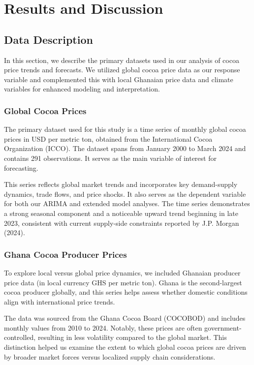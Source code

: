 \chapter{Results and Discussion}
\label{ch:Data}
\section{Data Description}

In this section, we describe the primary datasets used in our analysis of cocoa price trends and forecasts. We utilized global cocoa price data as our response variable and complemented this with local Ghanaian price data and climate variables for enhanced modeling and interpretation.

\subsection{Global Cocoa Prices}

The primary dataset used for this study is a time series of monthly global cocoa prices in USD per metric ton, obtained from the International Cocoa Organization (ICCO). The dataset spans from January 2000 to March 2024 and contains 291 observations. It serves as the main variable of interest for forecasting.

This series reflects global market trends and incorporates key demand-supply dynamics, trade flows, and price shocks. It also serves as the dependent variable for both our ARIMA and extended model analyses. The time series demonstrates a strong seasonal component and a noticeable upward trend beginning in late 2023, consistent with current supply-side constraints reported by J.P. Morgan (2024).

\subsection{Ghana Cocoa Producer Prices}

To explore local versus global price dynamics, we included Ghanaian producer price data (in local currency GHS per metric ton). Ghana is the second-largest cocoa producer globally, and this series helps assess whether domestic conditions align with international price trends.

The data was sourced from the Ghana Cocoa Board (COCOBOD) and includes monthly values from 2010 to 2024. Notably, these prices are often government-controlled, resulting in less volatility compared to the global market. This distinction helped us examine the extent to which global cocoa prices are driven by broader market forces versus localized supply chain considerations.

